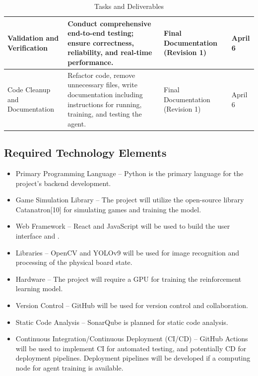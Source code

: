\documentclass{article}
\begin{document}
\begin{table}[H]
\begin{tabular}{|p{3cm}|p{5cm}|p{3cm}|p{2cm}|}
    Validation and Verification & Conduct comprehensive end-to-end testing; ensure correctness, reliability, and real-time performance. & Final Documentation (Revision 1) & April 6 \\ \hline
    
    Code Cleanup and Documentation & Refactor code, remove unnecessary files, write documentation including instructions for running, training, and testing the agent. & Final Documentation (Revision 1) & April 6 \\ \hline
    
    \end{tabular}
    \caption{Tasks and Deliverables}
    \label{tab:tasks-deliverables}
    \end{table}
    


\subsection{Required Technology Elements}\label{subsec:requiredtech}
\begin{itemize}
    \item {Primary Programming Language} – Python is the primary language for the project's backend development.
    \item {Game Simulation Library} – The project will utilize the open-source library Catanatron[10] for simulating \emph{\Catan{}} games and training the \AI{} model.
    \item {Web Framework} – React and JavaScript will be used to build the user interface and \DigitalTwin{}.
    \item {\CV{} Libraries} – OpenCV and YOLOv9 will be used for image recognition and processing of the physical board state.
    \item {Hardware} – The project will require a GPU for training the reinforcement learning model.
    \item {Version Control} – GitHub will be used for version control and collaboration.
    \item {Static Code Analysis} – SonarQube is planned for static code analysis.
    \item {Continuous Integration/Continuous Deployment (CI/CD)} – GitHub Actions will be used to implement CI for automated testing, and potentially CD for deployment pipelines. Deployment pipelines will be developed if a computing node for \RL{} agent training is available.
\end{itemize}
\end{document}
